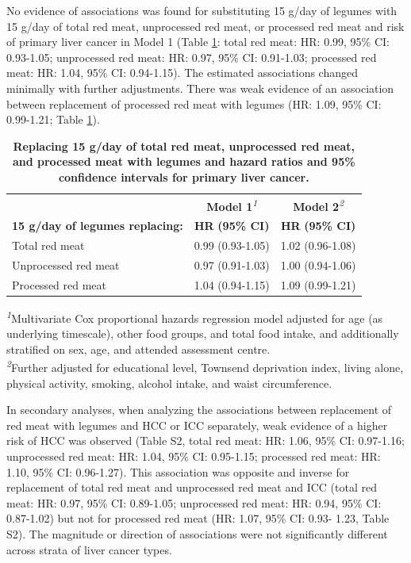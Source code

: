 \documentclass[nutrients,article,submit,moreauthors,pdftex]{Definitions/mdpi}
\begin{document}
No evidence of associations was found for substituting 15 g/day of
legumes with 15 g/day of total red meat, unprocessed red meat, or
processed red meat and risk of primary liver cancer in Model 1 (Table
\ref{tab:main}: total red meat:
HR: 0.99, 95\% CI: 0.93-1.05;
unprocessed red meat:
HR: 0.97, 95\% CI: 0.91-1.03;
processed red meat:
HR: 1.04, 95\% CI: 0.94-1.15).
The estimated associations changed minimally with further adjustments.
There was weak evidence of an association between replacement of
processed red meat with legumes
(HR: 1.09, 95\% CI: 0.99-1.21;
Table \ref{tab:main}).

\begin{table}[b]
\caption{\label{tab:main}\textbf{Replacing 15 g/day of total red meat, unprocessed red meat, and processed meat with legumes and hazard ratios and 95\% confidence intervals for primary liver cancer.}} 
\fontsize{9.0pt}{10.8pt}\selectfont
\begin{tabular*}{1\linewidth}{@{\extracolsep{\fill}}lcc}
\toprule
 & {\bfseries \textbf{Model 1}}\textsuperscript{\textit{1}} & {\bfseries \textbf{Model 2}}\textsuperscript{\textit{2}} \\ 
\cmidrule(lr){2-2} \cmidrule(lr){3-3}
\textbf{15 g/day of legumes replacing:} & \textbf{HR} \textbf{(95\% CI)} & \textbf{HR} \textbf{(95\% CI)} \\ 
\midrule\addlinespace[2.5pt]
Total red meat & 0.99 (0.93-1.05) & 1.02 (0.96-1.08) \\ 
Unprocessed red meat & 0.97 (0.91-1.03) & 1.00 (0.94-1.06) \\ 
Processed red meat & 1.04 (0.94-1.15) & 1.09 (0.99-1.21) \\ 
\bottomrule
\end{tabular*}
\begin{minipage}{\linewidth}
\textsuperscript{\textit{1}}Multivariate Cox proportional hazards regression model adjusted for age (as underlying timescale), other food groups, and total food intake, and additionally stratified on sex, age, and attended assessment centre.\\
\textsuperscript{\textit{2}}Further adjusted for educational level, Townsend deprivation index, living alone, physical activity, smoking, alcohol intake, and waist circumference.\\
\end{minipage}
\end{table}

In secondary analyses, when analyzing the associations between
replacement of red meat with legumes and HCC or ICC separately, weak
evidence of a higher risk of HCC was observed (Table S2, total red meat:
HR: 1.06, 95\% CI: 0.97-1.16;
unprocessed red meat:
HR: 1.04, 95\% CI: 0.95-1.15;
processed red meat:
HR: 1.10, 95\% CI: 0.96-1.27).
This association was opposite and inverse for replacement of total red
meat and unprocessed red meat and ICC (total red meat:
HR: 0.97, 95\% CI: 0.89-1.05;
unprocessed red meat:
HR: 0.94, 95\% CI: 0.87-1.02)
but not for processed red meat
(HR: 1.07, 95\% CI: 0.93- 1.23,
Table S2). The magnitude or direction of associations were not
significantly different across strata of liver cancer types.
\end{document}
